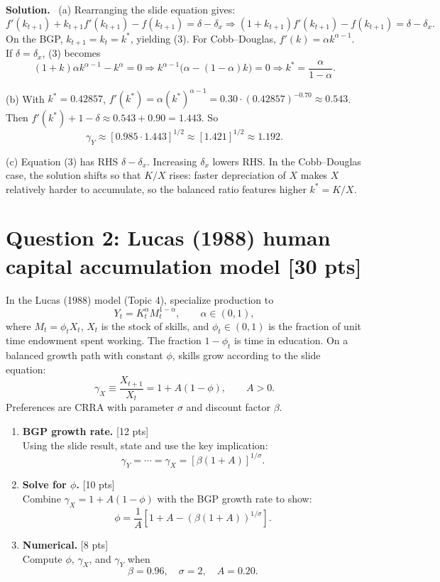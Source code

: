 \documentclass[12pt]{article}
\newenvironment{sol}{\par\medskip\noindent\textbf{Solution.}\ }{\par\medskip}
\newcommand{\pts}[1]{\hfill{\small[#1 pts]}}
\begin{document}
\begin{sol}
(a) Rearranging the slide equation gives:
\[
f'(k_{t+1})+k_{t+1}f'(k_{t+1})-f(k_{t+1})=\delta-\delta_x
\Rightarrow (1+k_{t+1})f'(k_{t+1})-f(k_{t+1})=\delta-\delta_x.
\]
On the BGP, \(k_{t+1}=k_t=k^\ast\), yielding (3).
For Cobb--Douglas, \(f'(k)=\alpha k^{\alpha-1}\). If \(\delta=\delta_x\), (3) becomes
\[
(1+k)\alpha k^{\alpha-1}-k^\alpha=0
\Rightarrow k^{\alpha-1}\big(\alpha-(1-\alpha)k\big)=0
\Rightarrow k^\ast=\frac{\alpha}{1-\alpha}.
\]

(b) With \(k^\ast=0.42857\), \(f'(k^\ast)=\alpha(k^\ast)^{\alpha-1}=0.30\cdot (0.42857)^{-0.70}\approx 0.543\).
Then \(f'(k^\ast)+1-\delta\approx 0.543+0.90=1.443\).
So
\[
\gamma_Y\approx [0.985\cdot 1.443]^{1/2}\approx [1.421]^{1/2}\approx 1.192.
\]

(c) Equation (3) has RHS \(\delta-\delta_x\). Increasing \(\delta_x\) lowers RHS.
In the Cobb--Douglas case, the solution shifts so that \(K/X\) rises: faster depreciation of \(X\) makes \(X\) relatively harder to accumulate,
so the balanced ratio features higher \(k^\ast=K/X\).
\end{sol}

\section*{Question 2: Lucas (1988) human capital accumulation model \pts{30}}

In the Lucas (1988) model (Topic 4), specialize production to
\[
Y_t = K_t^{\alpha} M_t^{1-\alpha}, \qquad \alpha\in(0,1),
\]
where \(M_t=\phi_t X_t\), \(X_t\) is the stock of skills, and \(\phi_t\in(0,1)\) is the fraction of unit time endowment spent working.
The fraction \(1-\phi_t\) is time in education.
On a balanced growth path with constant \(\phi\), skills grow according to the slide equation:
\[
\gamma_X \equiv \frac{X_{t+1}}{X_t} = 1 + A(1-\phi),
\qquad A>0.
\]
Preferences are CRRA with parameter \(\sigma\) and discount factor \(\beta\).

\begin{enumerate}[label=(\alph*)]
\item \textbf{BGP growth rate.} \pts{12}\\
Using the slide result, state and use the key implication:
\[
\gamma_Y = \cdots = \gamma_X = \left[\beta(1+A)\right]^{1/\sigma}.
\]

\item \textbf{Solve for \(\phi\).} \pts{10}\\
Combine \(\gamma_X = 1 + A(1-\phi)\) with the BGP growth rate to show:
\[
\phi = \frac{1}{A}\left[1+A-\left(\beta(1+A)\right)^{1/\sigma}\right].
\]

\item \textbf{Numerical.} \pts{8}\\
Compute \(\phi\), \(\gamma_X\), and \(\gamma_Y\) when
\[
\beta=0.96,\quad \sigma=2,\quad A=0.20.
\]
\end{enumerate}
\end{document}
